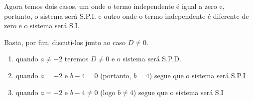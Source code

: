 Agora temos dois casos, um onde o termo independente é igual a zero e, portanto, o sistema será S.P.I. e outro onde o termo independente é diferente de zero e o sistema será S.I.

Basta, por fim, discuti-los junto ao caso $D\neq0$.

\begin{enumerate}[label={Caso (\Roman*)}, align=Center]
    \item quando $a\neq -2$ teremos $D\neq0$ e o sistema será S.P.D.
    \item quando $a=-2$ e $b-4=0$ (portanto, $b=4$) segue que o sistema será S.P.I
    \item quando $a=-2$ e $b-4\neq 0$ (logo $b\neq4$) segue que o sistema será S.I
\end{enumerate}